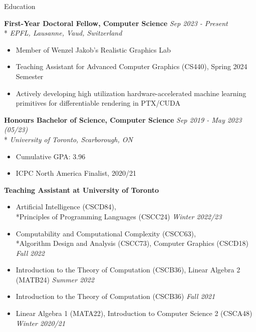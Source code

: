 \documentclass[11pt, letterpaper]{article}
\begin{document}
\begin{section}{Education}

\textbf{First-Year Doctoral Fellow, Computer Science}
\hfill
\textit{Sep 2023 - Present}\\*
\textit{EPFL, Lausanne, Vaud, Switzerland}
\begin{itemize}
  \item Member of Wenzel Jakob's Realistic Graphics Lab
  \item Teaching Assistant for Advanced Computer Graphics (CS440), Spring 2024 Semester
  \item Actively developing high utilization hardware-accelerated machine learning primitives for differentiable rendering in PTX/CUDA \\
\end{itemize}

\textbf{Honours Bachelor of Science, Computer Science}
\hfill
\textit{Sep 2019 - May 2023 (05/23)}\\*
\textit{University of Toronto, Scarborough, ON}
\begin{itemize}
  \item Cumulative GPA: 3.96
  \item ICPC North America Finalist, 2020/21 \\
\end{itemize}

\textbf{Teaching Assistant at University of Toronto}
\begin{itemize}
  \item Artificial Intelligence (CSCD84), \\*Principles of Programming Languages (CSCC24) \hfill \textit{Winter 2022/23}
  \item Computability and Computational Complexity (CSCC63), \\*Algorithm Design and Analysis (CSCC73), Computer Graphics (CSCD18) \hfill \textit{Fall 2022}
  \item Introduction to the Theory of Computation (CSCB36), Linear Algebra 2 (MATB24) \hfill \textit{Summer 2022}
  \item Introduction to the Theory of Computation (CSCB36) \hfill \textit{Fall 2021}
  \item Linear Algebra 1 (MATA22), Introduction to Computer Science 2 (CSCA48) \hfill \textit{Winter 2020/21}
\end{itemize}

\end{section}
\end{document}
